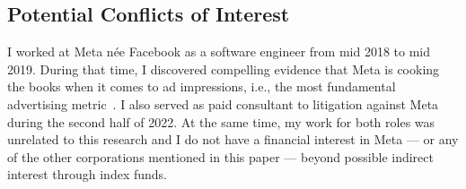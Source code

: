 \subsection{Potential Conflicts of Interest}

I worked at Meta n\'ee Facebook as a software engineer from mid 2018 to mid
2019. During that time, I discovered compelling evidence that Meta is cooking
the books when it comes to ad impressions, i.e., the most fundamental
advertising metric~. I also served as paid
consultant to litigation against Meta during the second half of 2022. At the
same time, my work for both roles was unrelated to this research and I do not
have a financial interest in Meta --- or any of the other corporations mentioned
in this paper --- beyond possible indirect interest through index funds.
